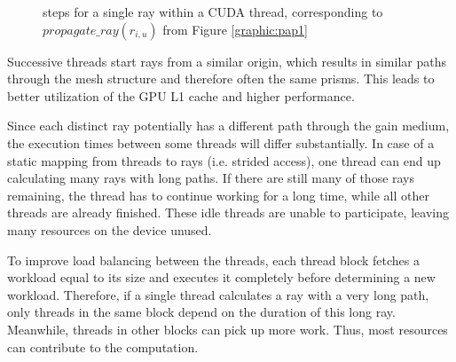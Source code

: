 \begin{figure}[H]
  \centerline
  {}
  \caption{steps for a single ray within a CUDA thread, corresponding to
  $propagate\_ray(r_{i,u})$ from Figure \ref{graphic:pap1}}
  \label{graphic:algorithm_steps}
\end{figure}

Successive threads start rays from a similar origin, which results
in similar paths through the mesh structure and therefore often the same prisms. This
leads to better utilization of the GPU L1 cache and higher performance.

Since each distinct ray potentially has a different path through the gain
medium, the execution times between some threads will differ substantially. In case
of a static mapping from threads to rays (i.e. strided access), one thread can
end up calculating many rays with long paths. If there are still many of those
rays remaining, the thread has to continue working for a long time, while all
other threads are already finished. These idle threads are unable to
participate, leaving many resources on the device unused.

To improve load balancing between the threads, each thread block fetches a
workload equal to its size and executes it completely before determining a new
workload. Therefore, if a single thread calculates a ray with a very long path,
only threads in the same block depend on the duration of this long ray.
Meanwhile, threads in other blocks can pick up more work. Thus, most resources
can contribute to the computation.
    
